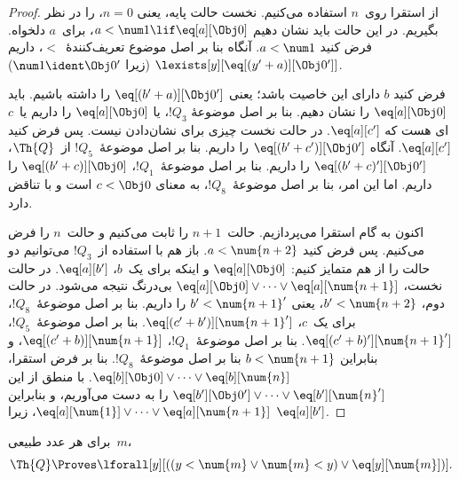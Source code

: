 \documentclass[../../../include/open-logic-section]{subfiles}
\begin{document}
\begin{proof}
از استقرا روی~$n$ استفاده می‌کنیم. نخست حالت پایه، یعنی $n = 0$، را
در نظر بگیریم. در این حالت باید نشان دهیم
$a < \num 1 \lif \eq[a][\Obj 0]$، برای~$a$ دلخواه. فرض کنید
$a < \num 1$. آنگاه بنا
بر اصل موضوع تعریف‌کنندهٔ~$<$، داریم
$\lexists[y][\eq[(y'+a)][\Obj 0']]$ (زیرا $\num 1 \ident \Obj 0'$).

فرض کنید $b$ دارای این خاصیت باشد؛ یعنی $\eq[(b'+a)][\Obj 0']$ را
داشته باشیم. باید $\eq[a][\Obj 0]$ را نشان دهیم. بنا بر اصل موضوعهٔ
$!Q_3$، یا $\eq[a][\Obj 0]$ را داریم یا~$c$ای هست که
$\eq[a][c']$. در حالت نخست چیزی برای نشان‌دادن نیست. پس فرض کنید
$\eq[a][c']$. آنگاه $\eq[(b' + c')][\Obj 0']$ را داریم. بنا بر اصل
موضوعهٔ~$!Q_5$ از~$\Th{Q}$، $\eq[(b'+c)'][\Obj 0']$ را داریم. بنا بر
اصل موضوعهٔ~$!Q_1$، $\eq[(b' + c)][\Obj 0]$ را داریم. اما این امر،
بنا بر اصل موضوعهٔ~$!Q_8$، به معنای $c < \Obj 0$ است و با
 تناقض دارد.

اکنون به گام استقرا می‌پردازیم. حالت~$n+1$ را ثابت می‌کنیم و حالت~$n$
را فرض می‌کنیم. پس فرض کنید $a < \num {n+2}$. باز هم با استفاده از~$!Q_3$
می‌توانیم دو حالت را از هم متمایز کنیم: $\eq[a][\Obj 0]$ و اینکه برای
یک~$b$، $\eq[a][b']$. در حالت نخست،
$\eq[a][\Obj 0] \lor \dots \lor \eq[a][\num{n+1}]$ بی‌درنگ نتیجه
می‌شود. در حالت دوم، $b' < \num {n+2}$، یعنی
$b' < \num{n+1}'$ را داریم. بنا بر اصل موضوعهٔ~$!Q_8$، برای یک~$c$،
$\eq[(c'+b')][\num{n+1}']$. بنا بر اصل موضوعهٔ~$!Q_5$،
$\eq[(c'+b)'][\num{n+1}']$. بنا بر اصل موضوعهٔ~$!Q_1$،
$\eq[(c'+b)][\num{n+1}]$، و بنابراین
$b < \num{n+1}$ بنا بر اصل موضوعهٔ~$!Q_8$. بنا بر فرض استقرا،
$\eq[b][\Obj 0] \lor \dots \lor \eq[b][\num{n}]$. با منطق از این
$\eq[b'][\Obj 0'] \lor \dots \lor \eq[b'][\num{n}']$ را به دست
می‌آوریم، و بنابراین
$\eq[a][\num{1}] \lor \dots \lor \eq[a][\num{n+1}]$، زیرا
$\eq[a][b']$.
\end{proof}

\begin{lem}
   برای هر عدد طبیعی~$m$،
  \[
  \Th{Q} \Proves
  \lforall[y][((y < \num{m} \lor \num{m} < y) \lor \eq[y][\num{m}])].
  \]
\end{lem}
\end{document}
